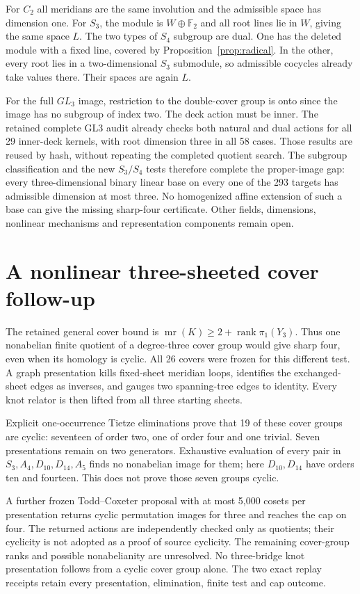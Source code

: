 \documentclass[11pt]{article}
\newcommand{\F}{\mathbb F}
\newcommand{\mr}{\operatorname{mr}}
\newcommand{\rank}{\operatorname{rank}}
\begin{document}
For $C_2$ all meridians are the same involution and the
admissible space has dimension one. For $S_3$, the module is
$W\oplus\F_2$ and all root lines lie in $W$, giving the same
space $L$. The two types of $S_4$ subgroup are dual. One has
the deleted module with a fixed line, covered by
Proposition~\ref{prop:radical}. In the other, every root lies
in a two-dimensional $S_3$ submodule, so admissible cocycles
already take values there. Their spaces are again $L$.

For the full $GL_3$ image, restriction to the double-cover
group is onto since the image has no subgroup of index two.
The deck action must be inner. The retained complete GL3
audit already checks both natural and dual actions for all
29 inner-deck kernels, with root dimension three in all 58
cases. Those results are reused by hash, without repeating
the completed quotient search. The subgroup classification
and the new $S_3/S_4$ tests therefore complete the proper-image
gap: every three-dimensional binary linear base on every
one of the 293 targets has admissible dimension at most three.
No homogenized affine extension of such a base can give the
missing sharp-four certificate. Other fields, dimensions,
nonlinear mechanisms and representation components remain open.

\section{A nonlinear three-sheeted cover follow-up}

The retained general cover bound is
$\mr(K)\ge2+\rank\pi_1(Y_3)$. Thus one nonabelian finite
quotient of a degree-three cover group would give sharp four,
even when its homology is cyclic. All 26 covers were frozen
for this different test. A graph presentation kills fixed-sheet
meridian loops, identifies the exchanged-sheet edges as inverses,
and gauges two spanning-tree edges to identity. Every knot
relator is then lifted from all three starting sheets.

Explicit one-occurrence Tietze eliminations prove that 19 of
these cover groups are cyclic: seventeen of order two, one
of order four and one trivial. Seven presentations remain on
two generators. Exhaustive evaluation of every pair in
$S_3,A_4,D_{10},D_{14},A_5$ finds no nonabelian image for them;
here $D_{10},D_{14}$ have orders ten and fourteen. This does
not prove those seven groups cyclic.

A further frozen Todd--Coxeter proposal with at most 5,000
cosets per presentation returns cyclic permutation images for
three and reaches the cap on four. The returned actions are
independently checked only as quotients; their cyclicity is
not adopted as a proof of source cyclicity. The remaining
cover-group ranks and possible nonabelianity are unresolved.
No three-bridge knot presentation follows from a cyclic cover
group alone. The two exact replay receipts retain every
presentation, elimination, finite test and cap outcome.
\end{document}
